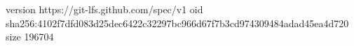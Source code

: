 version https://git-lfs.github.com/spec/v1
oid sha256:4102f7dfd083d25dec6422c32297bc966d67f7b3cd974309484adad45ea4d720
size 196704
